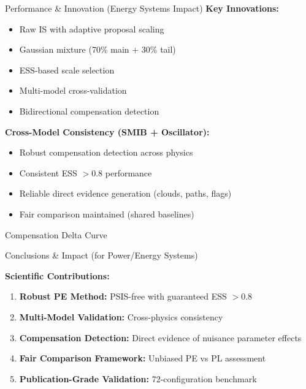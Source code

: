 \documentclass[final,hyperref={pdfpagelabels=false}]{beamer}
\begin{document}
\begin{frame}[t]
\begin{columns}[t,totalwidth=\textwidth]
\begin{column}{0.32\textwidth}
\begin{exampleblock}{Performance \& Innovation (Energy Systems Impact)}
\textbf{Key Innovations:}
\begin{itemize}
\item Raw IS with adaptive proposal scaling
\item Gaussian mixture (70\% main + 30\% tail)
\item ESS-based scale selection
\item Multi-model cross-validation
\item Bidirectional compensation detection
\end{itemize}

\textbf{Cross-Model Consistency (SMIB + Oscillator):}
\begin{itemize}
\item Robust compensation detection across physics
\item Consistent ESS $> 0.8$ performance  
\item Reliable direct evidence generation (clouds, paths, flags)
\item Fair comparison maintained (shared baselines)
\end{itemize}

\end{exampleblock}

\begin{block}{Compensation Delta Curve}
\small

\begin{center}
\end{center}

\end{block}

\begin{alertblock}{Conclusions \& Impact (for Power/Energy Systems)}
\small

\textbf{Scientific Contributions:}
\begin{enumerate}
\item \textbf{Robust PE Method:} PSIS-free with guaranteed ESS $> 0.8$
\item \textbf{Multi-Model Validation:} Cross-physics consistency
\item \textbf{Compensation Detection:} Direct evidence of nuisance parameter effects
\item \textbf{Fair Comparison Framework:} Unbiased PE vs PL assessment
\item \textbf{Publication-Grade Validation:} 72-configuration benchmark
\end{enumerate}


\end{alertblock}
\end{column}
\end{columns}
\end{frame}
\end{document}
